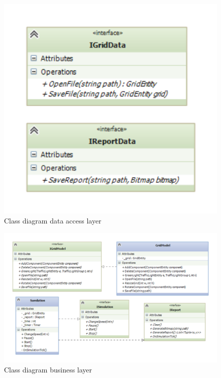 \newpage
\begin{figure}[!ht]
	\centering
	\includegraphics{figures/DataLayer}
	\caption{Class diagram data access layer}
	\label{fig:data}
\end{figure}



\begin{landscape}
	\begin{figure}[!ht]
		\centering
		\includegraphics[height=\textheight]{figures/BusinessLayer}
		\caption{Class diagram business layer}
		\label{fig:bus}
	\end{figure}
\end{landscape}

